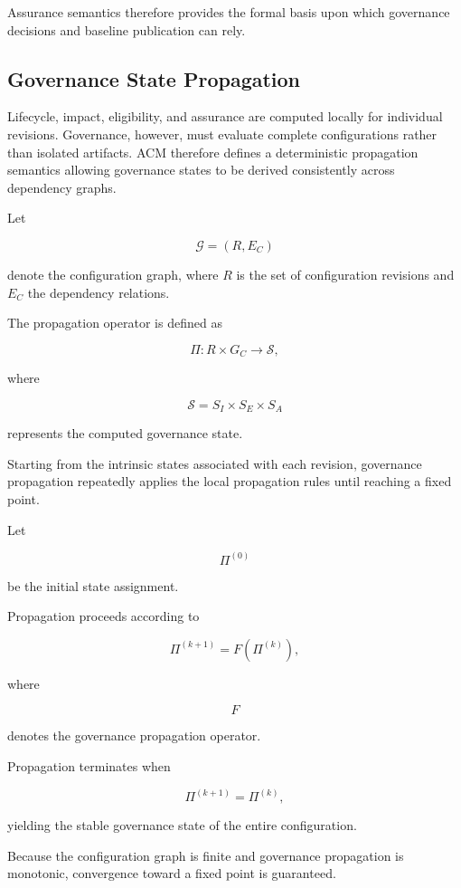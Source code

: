 \documentclass[10pt]{article}
\begin{document}
Assurance semantics therefore provides the formal basis upon which governance decisions and baseline publication can rely.

\subsection{Governance State Propagation}
\label{sec:governance_semantics}

Lifecycle, impact, eligibility, and assurance are computed locally for individual revisions. Governance, however, must evaluate complete configurations rather than isolated artifacts. ACM therefore defines a deterministic propagation semantics allowing governance states to be derived consistently across dependency graphs.

Let

\[
\mathcal{G}
=
(R,E_C)
\]

denote the configuration graph, where \(R\) is the set of configuration revisions and \(E_C\) the dependency relations.

The propagation operator is defined as

\[
\Pi
:
R\times G_C
\rightarrow
\mathcal{S},
\]

where

\[
\mathcal{S}
=
S_I
\times
S_E
\times
S_A
\]

represents the computed governance state.

Starting from the intrinsic states associated with each revision, governance propagation repeatedly applies the local propagation rules until reaching a fixed point.

Let

\[
\Pi^{(0)}
\]

be the initial state assignment.

Propagation proceeds according to

\[
\Pi^{(k+1)}
=
F
\left(
\Pi^{(k)}
\right),
\]

where

\[
F
\]

denotes the governance propagation operator.

Propagation terminates when

\[
\Pi^{(k+1)}
=
\Pi^{(k)},
\]

yielding the stable governance state of the entire configuration.

Because the configuration graph is finite and governance propagation is monotonic, convergence toward a fixed point is guaranteed.
\end{document}
